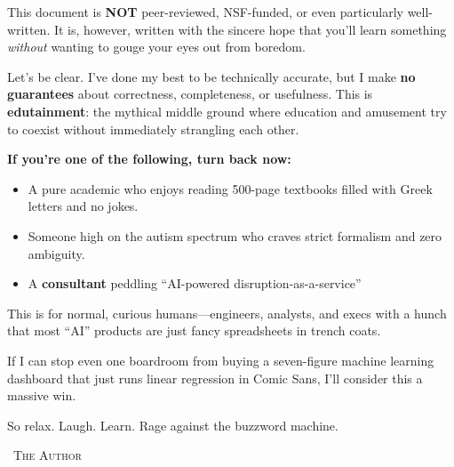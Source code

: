 \begin{tcolorbox}[
    enhanced,
    breakable,
    colback=white,
    colframe=red!70!black,
    coltitle=black,
    boxrule=1pt,
    arc=2mm,
    left=8mm,
    right=8mm,
    top=5mm,
    bottom=5mm,
    sharp corners=south,
    fonttitle=\LARGE\bfseries\sffamily,
    fontupper=\large\sffamily,
    title=\faExclamationTriangle\quad DISCLAIMER: PROCEED WITH CAUTION (AND MAYBE POPCORN)
  ]
  
  \bigskip
  
  This document is \textbf{NOT} peer-reviewed, NSF-funded, or even particularly well-written.  It is, however, written with the sincere hope that you’ll learn something \textit{without} wanting to gouge your eyes out from boredom.

  \medskip
  
  Let’s be clear. I’ve done my best to be technically accurate, but I make \textbf{no guarantees} about correctness, completeness, or usefulness.  This is \textbf{edutainment}: the mythical middle ground where education and amusement try to coexist without immediately strangling each other.

  \medskip
  
  \textbf{\large If you're one of the following, turn back now:}

  \medskip
  
  \begin{itemize}
    \item A pure academic who enjoys reading 500-page textbooks filled with Greek letters and no jokes.
    \item Someone high on the autism spectrum who craves strict formalism and zero ambiguity.
    \item A \textbf{consultant} peddling ``AI-powered disruption-as-a-service'' 
  \end{itemize}

  \medskip
  
  This is for normal, curious humans—engineers, analysts, and execs with a hunch that most “AI” products are just fancy spreadsheets in trench coats.

  \medskip
  
  If I can stop even one boardroom from buying a seven-figure machine learning dashboard that just runs linear regression in Comic Sans, I’ll consider this a massive win.

  \medskip
  
  So relax. Laugh. Learn. Rage against the buzzword machine.
  
  \bigskip
  
  \hfill\textemdash\ \textsc{The Author}
  
  \end{tcolorbox}
  